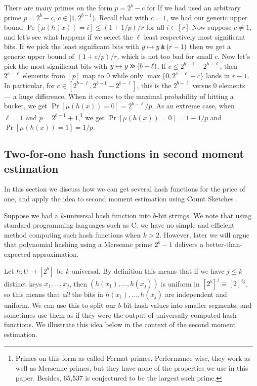 \vspace{.5em}

There are many primes on the form $p=2^b-c$ for 
      If we had used an  arbitrary prime $p=2^b-c$, $c\in [1,2^{b-1})$.
Recall that with $c=1$, we had our generic upper bound
$\Pr[\mu(h(x))=i]\leq (1+1/p)/r$ for all $i\in[r]$
Now suppose $c\neq 1$, and let's see what happens if we select
the $\ell$ least respectively most significant bits. If
we pick the least significant bits with $y\mapsto y\mathbin{\texttt{\&}}(r-1)$
then we get a generic upper bound of $(1+c/p)/r$, which is not
too bad for small $c$.
Now let's pick the most significant bits with $y\mapsto y\mathbin{\texttt{>\!>}} (b-\ell)$.
If $c\leq 2^{b-1}-2^{b-\ell}$, then $2^{b-\ell}$ elements from
$[p]$ map to $0$ while only $\max\{0,2^{b-\ell}-c\}$
lands in $r-1$. In particular, for $c\in [2^{b-\ell}, 2^{b-1}-2^{b-\ell}]$,
this is the $2^{b-\ell}$ versus $0$ elements --- a huge difference.
When it comes to the maximal probability of hitting a bucket,
we get $\Pr[\mu(h(x))=0]=2^{b-\ell}/p$.
As an extreme case, when $\ell=1$ and $p=2^{b-1}+1$,\footnote{Primes on this form as called Fermat primes.
   Performance wise, they work as well as Mersenne primes, but they have none of the properties we use in this paper.
Besides, 65,537 is conjectured to be the largest such prime.}
we get $\Pr[\mu(h(x))=0]=1-1/p$ and $\Pr[\mu(h(x))=1]=1/p$.

\subsection{Two-for-one hash functions in second moment estimation}
In this section we discuss how we can get several hash functions for
the price of one, and apply the idea to second moment estimation using
Count Sketches \cite{charikar04count-sketch}.

Suppose we had a $k$-universal hash function into $b$-bit strings.
We note that using standard programming languages such as C, we have
no simple and efficient method computing such hash
functions when $k>2$. However, later we will argue that polynomial
hashing using a Mersenne prime $2^b-1$ delivers a better-than-expected
approximation.

Let $h:U\to [2^b]$ be $k$-universal. By definition this
means that if we have $j\leq k$ distinct keys $x_1,\ldots,x_j$, then
$(h(x_1),\ldots,h(x_j))$ is uniform in $[2^b]^j\equiv [2]^{bj}$,
so this means that \emph{all} the bits in $h(x_1),\ldots,h(x_j)$ are
independent and uniform. We can use this to split our $b$-bit hash
values into smaller segments, and sometimes use them as if
they were the output of universally computed hash functions.
We illustrate this idea below in the context of the second moment estimation.


